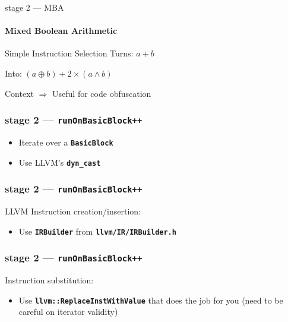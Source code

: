 \documentclass[14pt]{beamer}
\newcommand{\Code}[1]{\textbf{\texttt{#1}}}
\begin{document}
    \begin{frame}{stage 2 --- MBA}
        \framesubtitle{Mixed Boolean Arithmetic}

        \begin{alertblock}{Simple Instruction Selection}
            Turns: $a + b$

            Into: $(a \oplus b) + 2 \times (a \wedge b)$
        \end{alertblock}

        \begin{block}{Context}
            \alert{$\Rightarrow$} Useful for code obfuscation
        \end{block}

    \end{frame}

    \begin{frame}[containsverbatim]
    \frametitle{stage 2 --- \texttt{runOnBasicBlock++}}
    \begin{itemize}
        \item Iterate over a \Code{BasicBlock}
        \item Use LLVM's \Code{dyn\_cast}
    \end{itemize}
    {
        \scriptsize
        
    }
    \end{frame}

    \begin{frame}[containsverbatim]
    \frametitle{stage 2 --- \texttt{runOnBasicBlock++}}
    LLVM Instruction creation/insertion:
    \begin{itemize}
        \item Use \Code{IRBuilder} from \Code{llvm/IR/IRBuilder.h}
    \end{itemize}
    \hspace{-5em}%
    \begin{minipage}{\textwidth}
        \scriptsize
        
    \end{minipage}
    \end{frame}

    \begin{frame}[containsverbatim]
    \frametitle{stage 2 --- \texttt{runOnBasicBlock++}}
    Instruction substitution:
    \begin{itemize}
		\item Use \Code{llvm::ReplaceInstWithValue} that does the job for you
			(need to be careful on iterator validity)
    \end{itemize}
    \hspace{-6em}%
    \begin{minipage}{\textwidth}
        \footnotesize
        
    \end{minipage}
    \end{frame}
\end{document}
